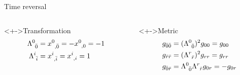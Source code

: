 \documentclass{beamer}
\let\svthefootnote\thefootnote
\newcommand\blankfootnote[1]{%
  \let\thefootnote\relax\footnotetext{#1}%
  \let\thefootnote\svthefootnote%
}
\begin{document}
\begin{frame}{Time reversal}


\begin{columns}[t]
  \begin{column}{0.4\textwidth}
    \begin{block}<+->{Transformation}
      \begin{align*}
        \tensor{\Lambda}{^0_{\bar0}} &=
        \tensor{x}{^0_{,\bar0}} = -\tensor{x}{^0_{,0}} = -1
        \\
        \tensor{\Lambda}{^i_{\bar{i}}} &=
        \tensor{x}{^i_{,\bar{i}}} = \tensor{x}{^i_{,i}} = 1
      \end{align*}
    \end{block}
  \end{column}

  \begin{column}{0.4\textwidth}
    \begin{block}<+->{Metric}
      \begin{align*}
        g_{\bar0 \bar0} &=
        (\tensor{\Lambda}{^0_{\bar0}})^2 g_{00} =
        g_{00}
        \\
        g_{\bar{r} \bar{r}} &=
        (\tensor{\Lambda}{^r_{\bar{r}}})^2 g_{rr} =
        g_{rr}
        \\
        g_{\bar0 \bar{r}} &=
        \tensor{\Lambda}{^0_{\bar0}} \tensor{\Lambda}{^r_{\bar{r}}} g_{0r} =
        -g_{0r}
      \end{align*}
    \end{block}
  \end{column}
\end{columns}

\blankfootnote{\textcite[p. 258]{Schutz}}


\note{

}
\end{frame}
\end{document}
